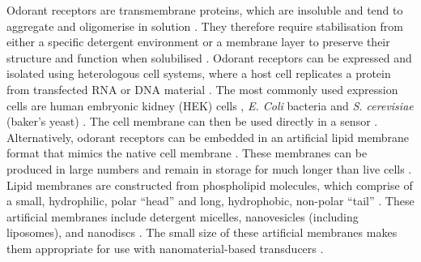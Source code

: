 \documentclass[
  a4paper,
]{scrbook}
\begin{document}
Odorant receptors are transmembrane proteins, which are insoluble and
tend to aggregate and oligomerise in solution \autocite{Nath2007}. They
therefore require stabilisation from either a specific detergent
environment or a membrane layer to preserve their structure and function
when solubilised \autocite{Fruh2011,Dung2018}. Odorant receptors can be
expressed and isolated using heterologous cell systems, where a host
cell replicates a protein from transfected RNA or DNA material
\autocite{Glatz2011,Dung2018}. The most commonly used expression cells
are human embryonic kidney (HEK) cells \autocite{Lim2014,Ahn2020},
\emph{E. Coli} bacteria \autocite{Yang2017,Yang2018} and \emph{S.
cerevisiae} (baker's yeast) \autocite{Bohbot2020}. The cell membrane can
then be used directly in a sensor \autocite{Dung2018}. Alternatively,
odorant receptors can be embedded in an artificial lipid membrane format
that mimics the native cell membrane \autocite{Nath2007}. These
membranes can be produced in large numbers and remain in storage for
much longer than live cells \autocite{Goldsmith2011,Lim2015}. Lipid
membranes are constructed from phospholipid molecules, which comprise of
a small, hydrophilic, polar ``head'' and long, hydrophobic, non-polar
``tail'' \autocite{Bose2021,Ramadon2022}. These artificial membranes
include detergent micelles, nanovesicles (including liposomes), and
nanodiscs \autocite{Yang2018,Moon2020}. The small size of these
artificial membranes makes them appropriate for use with
nanomaterial-based transducers \autocite{Lim2015,Dung2018}.
\end{document}
